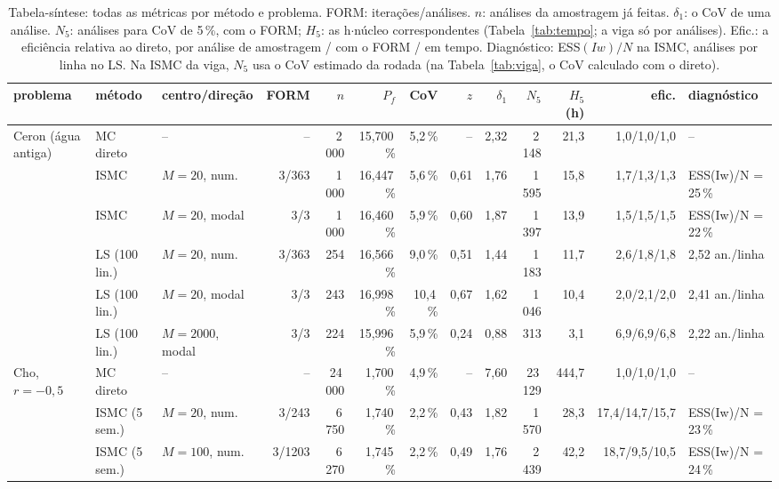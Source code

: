 \begin{landscape}
\begin{table}[p]\centering\footnotesize\setlength{\tabcolsep}{4pt}
\caption{Tabela-síntese: todas as métricas por método e problema. FORM: iterações/análises. $n$: análises da amostragem já feitas. $\delta_1$: o CoV de uma análise. $N_5$: análises para CoV de 5\,\%, com o FORM; $H_5$: as h$\cdot$núcleo correspondentes (Tabela~\ref{tab:tempo}; a viga só por análises). Efic.: a eficiência relativa ao direto, por análise de amostragem / com o FORM / em tempo. Diagnóstico: ESS$(Iw)/N$ na ISMC, análises por linha no LS. Na ISMC da viga, $N_5$ usa o CoV estimado da rodada (na Tabela~\ref{tab:viga}, o CoV calculado com o direto).}\label{tab:sintese}
\begin{tabular}{lllrrrrrrrrrl}\toprule
problema & método & centro/direção & FORM & $n$ & $P_f$ & CoV & $z$ & $\delta_1$ & $N_5$ & $H_5$ (h) & efic. & diagnóstico \\\midrule
Ceron (água antiga) & MC direto & -- & -- & 2\,000 & 15,700\,\% & 5,2\,\% & -- & 2,32 & 2\,148 & 21,3 & 1,0/1,0/1,0 & -- \\
 & ISMC & $M = 20$, num. & 3/363 & 1\,000 & 16,447\,\% & 5,6\,\% & 0,61 & 1,76 & 1\,595 & 15,8 & 1,7/1,3/1,3 & ESS(Iw)/N = 25\,\% \\
 & ISMC & $M = 20$, modal & 3/3 & 1\,000 & 16,460\,\% & 5,9\,\% & 0,60 & 1,87 & 1\,397 & 13,9 & 1,5/1,5/1,5 & ESS(Iw)/N = 22\,\% \\
 & LS (100 lin.) & $M = 20$, num. & 3/363 & 254 & 16,566\,\% & 9,0\,\% & 0,51 & 1,44 & 1\,183 & 11,7 & 2,6/1,8/1,8 & 2,52 an./linha \\
 & LS (100 lin.) & $M = 20$, modal & 3/3 & 243 & 16,998\,\% & 10,4\,\% & 0,67 & 1,62 & 1\,046 & 10,4 & 2,0/2,1/2,0 & 2,41 an./linha \\
 & LS (100 lin.) & $M = 2000$, modal & 3/3 & 224 & 15,996\,\% & 5,9\,\% & 0,24 & 0,88 & 313 & 3,1 & 6,9/6,9/6,8 & 2,22 an./linha \\
\midrule
Cho, $r = -0{,}5$ & MC direto & -- & -- & 24\,000 & 1,700\,\% & 4,9\,\% & -- & 7,60 & 23\,129 & 444,7 & 1,0/1,0/1,0 & -- \\
 & ISMC (5 sem.) & $M = 20$, num. & 3/243 & 6\,750 & 1,740\,\% & 2,2\,\% & 0,43 & 1,82 & 1\,570 & 28,3 & 17,4/14,7/15,7 & ESS(Iw)/N = 23\,\% \\
 & ISMC (5 sem.) & $M = 100$, num. & 3/1203 & 6\,270 & 1,745\,\% & 2,2\,\% & 0,49 & 1,76 & 2\,439 & 42,2 & 18,7/9,5/10,5 & ESS(Iw)/N = 24\,\% \\

\end{tabular}
\end{table}
\end{landscape}

